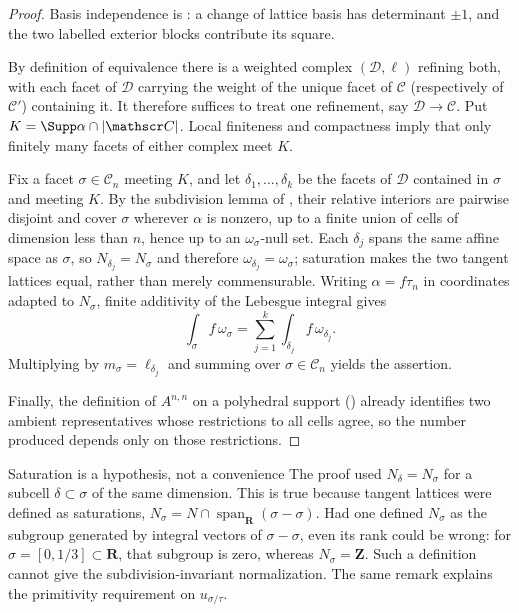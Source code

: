 \begin{proof}
Basis independence is : a change of
lattice basis has determinant $\pm1$, and the two labelled exterior blocks
contribute its square.

By definition of equivalence there is a weighted complex
$(\mathscr D,\ell)$ refining both, with each facet of $\mathscr D$ carrying
the weight of the unique facet of $\mathscr C$ (respectively of
$\mathscr C'$) containing it.  It therefore suffices to treat one refinement,
say $\mathscr D\to\mathscr C$.  Put
$K=\Supp\alpha\cap|\mathscr C|$.  Local finiteness and compactness imply
that only finitely many facets of either complex meet $K$.

Fix a facet $\sigma\in\mathscr C_n$ meeting $K$, and let
$\delta_1,\ldots,\delta_k$ be the facets of $\mathscr D$ contained in
$\sigma$ and meeting $K$.  By the subdivision lemma of
, their relative interiors are pairwise disjoint
and cover $\sigma$ wherever $\alpha$ is nonzero, up to a finite union of
cells of dimension less than $n$, hence up to an
$\omega_\sigma$-null set.  Each $\delta_j$ spans the same affine space as
$\sigma$, so $N_{\delta_j}=N_\sigma$ and therefore
$\omega_{\delta_j}=\omega_\sigma$; saturation makes the two tangent
lattices equal, rather than merely commensurable.  Writing
$\alpha=f\tau_n$ in coordinates adapted to $N_\sigma$, finite additivity
of the Lebesgue integral gives
\[
 \int_\sigma f\,\omega_\sigma
 =\sum_{j=1}^k\int_{\delta_j}f\,\omega_{\delta_j}.
\]
Multiplying by $m_\sigma=\ell_{\delta_j}$ and summing over
$\sigma\in\mathscr C_n$ yields the assertion.

Finally, the definition of $A^{n,n}$ on a polyhedral support
() already identifies two ambient representatives
whose restrictions to all cells agree, so the number produced depends only on
those restrictions.
\end{proof}

\begin{warning}{Saturation is a hypothesis, not a convenience}
The proof used $N_{\delta}=N_\sigma$ for a subcell $\delta\subset\sigma$ of
the same dimension.  This is true because tangent lattices were defined as
saturations, $N_\sigma=N\cap\operatorname{span}_{\mathbf R}(\sigma-\sigma)$.
Had one defined $N_\sigma$ as the subgroup generated by integral vectors of
$\sigma-\sigma$, even its rank could be wrong: for
$\sigma=[0,1/3]\subset\mathbf R$, that subgroup is zero, whereas
$N_\sigma=\mathbf Z$.  Such a definition cannot give the
subdivision-invariant normalization.  The same remark explains the
primitivity requirement on $u_{\sigma/\tau}$.
\end{warning}

